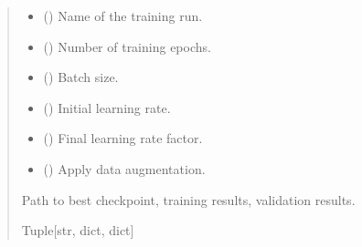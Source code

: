 \documentclass[letterpaper,10pt,english]{sphinxmanual}
\begin{document}
\begin{fulllineitems}
\begin{quote}
\begin{description}
\begin{itemize}
\item {} 
\sphinxAtStartPar
{} (\sphinxstyleliteralemphasis{\sphinxupquote{, }}) \textendash{} Name of the training run.

\item {} 
\sphinxAtStartPar
{} (\sphinxstyleliteralemphasis{\sphinxupquote{, }}) \textendash{} Number of training epochs.

\item {} 
\sphinxAtStartPar
{} (\sphinxstyleliteralemphasis{\sphinxupquote{, }}) \textendash{} Batch size.

\item {} 
\sphinxAtStartPar
{} (\sphinxstyleliteralemphasis{\sphinxupquote{, }}) \textendash{} Initial learning rate.

\item {} 
\sphinxAtStartPar
{} (\sphinxstyleliteralemphasis{\sphinxupquote{, }}) \textendash{} Final learning rate factor.

\item {} 
\sphinxAtStartPar
{} (\sphinxstyleliteralemphasis{\sphinxupquote{, }}) \textendash{} Apply data augmentation.

\end{itemize}

\sphinxAtStartPar
Path to best checkpoint, training results, validation results.

\sphinxAtStartPar
Tuple{[}str, dict, dict{]}

\end{description}\end{quote}

\end{fulllineitems}
\end{document}

